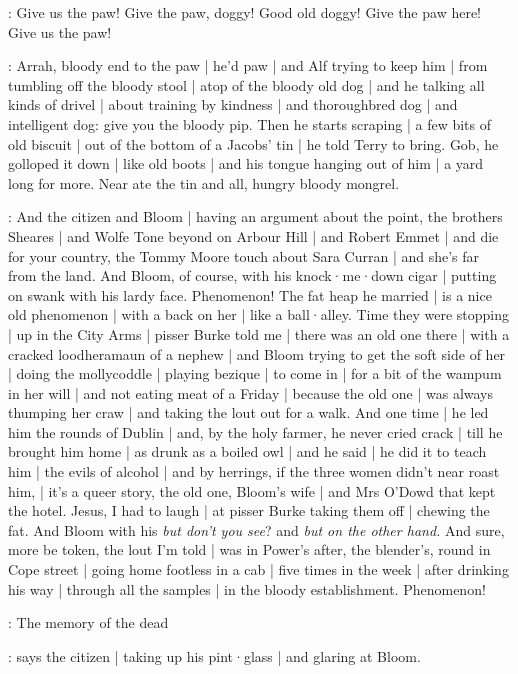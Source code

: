 \doran:
Give us the paw!
Give the paw,
doggy!
Good old doggy!
Give the paw here!
Give us the paw!

\Nq:
Arrah,
bloody end to the paw |
he'd paw |
and Alf trying to keep him |
from tumbling off the bloody stool |
atop of the bloody old dog |
and he talking all kinds of drivel |
about training by kindness |
and thoroughbred dog |
and intelligent dog:
give you the bloody pip.
Then he starts scraping |
a few bits of old biscuit |
out of the bottom of a Jacobs' tin |
he told Terry to bring.
Gob,
he golloped it down |
like old boots |
and his tongue hanging out of him |
a yard long for more.
Near ate the tin and all,
hungry bloody mongrel.

\Nq:
And the citizen and Bloom |
having an argument about the point,
the brothers Sheares |
and Wolfe Tone beyond on Arbour Hill |
and Robert Emmet |
and die for your country,
the Tommy Moore touch about Sara Curran |
and she's far from the land.
And Bloom,
of course,
with his knock·me·down cigar |
putting on swank with his lardy face.
Phenomenon!
The fat heap he married |
is a nice old phenomenon |
with a back on her |
like a ball·alley.
Time they were stopping |
up in the City Arms |
pisser Burke told me |
there was an old one there |
with a cracked loodheramaun of a nephew |
and Bloom trying to get the soft side of her |
doing the mollycoddle |
playing bezique |
to come in |
for a bit of the wampum in her will |
and not eating meat of a Friday |
because the old one |
was always thumping her craw |
and taking the lout out for a walk.
And one time |
he led him the rounds of Dublin |
and,
by the holy farmer,
he never cried crack |
till he brought him home |
as drunk as a boiled owl |
and he said |
he did it to teach him |
the evils of alcohol |
and by herrings,
if the three women didn't near roast him, |
it's a queer story,
the old one,
Bloom's wife |
and Mrs O'Dowd that kept the hotel.
Jesus,
I had to laugh |
at pisser Burke taking them off |
chewing the fat.
And Bloom with his \emph{but don't you see}?
and \emph{but on the other hand.}
And sure,
more be token,
the lout I'm told |
was in Power's after,
the blender's,
round in Cope street |
going home footless in a cab |
five times in the week |
after drinking his way |
through all the samples |
in the bloody establishment.
Phenomenon!

\citizen:
The memory of the dead

\Nq:
says the citizen |
taking up his pint·glass |
and glaring at Bloom.%

